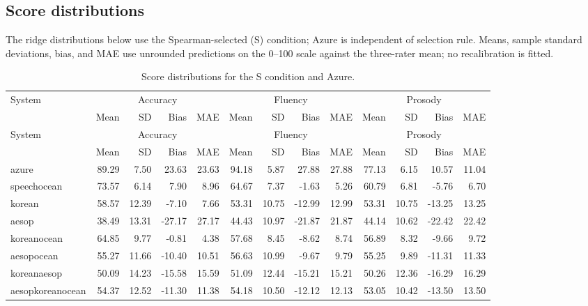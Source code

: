 \documentclass[10pt]{article}
\begin{document}
\begin{landscape}
\begingroup\small\setlength{\tabcolsep}{4pt}\setlength{\LTcapwidth}{\linewidth}
\subsection{Score distributions}
The ridge distributions below use the Spearman-selected (S) condition; Azure is independent of selection rule. Means, sample standard deviations, bias, and MAE use unrounded predictions on the 0--100 scale against the three-rater mean; no recalibration is fitted.
\begin{longtable}{@{}lrrrrrrrrrrrr@{}}
\caption{Score distributions for the S condition and Azure.}\\
\toprule
System & \multicolumn{4}{c}{Accuracy} & \multicolumn{4}{c}{Fluency} & \multicolumn{4}{c}{Prosody}\\
 & Mean & SD & Bias & MAE & Mean & SD & Bias & MAE & Mean & SD & Bias & MAE\\\midrule
\endfirsthead
\toprule
System & \multicolumn{4}{c}{Accuracy} & \multicolumn{4}{c}{Fluency} & \multicolumn{4}{c}{Prosody}\\
 & Mean & SD & Bias & MAE & Mean & SD & Bias & MAE & Mean & SD & Bias & MAE\\\midrule
\endhead
\bottomrule\endfoot
azure & 89.29 & 7.50 & 23.63 & 23.63 & 94.18 & 5.87 & 27.88 & 27.88 & 77.13 & 6.15 & 10.57 & 11.04\\
speechocean & 73.57 & 6.14 & 7.90 & 8.96 & 64.67 & 7.37 & -1.63 & 5.26 & 60.79 & 6.81 & -5.76 & 6.70\\
korean & 58.57 & 12.39 & -7.10 & 7.66 & 53.31 & 10.75 & -12.99 & 12.99 & 53.31 & 10.75 & -13.25 & 13.25\\
aesop & 38.49 & 13.31 & -27.17 & 27.17 & 44.43 & 10.97 & -21.87 & 21.87 & 44.14 & 10.62 & -22.42 & 22.42\\
koreanocean & 64.85 & 9.77 & -0.81 & 4.38 & 57.68 & 8.45 & -8.62 & 8.74 & 56.89 & 8.32 & -9.66 & 9.72\\
aesopocean & 55.27 & 11.66 & -10.40 & 10.51 & 56.63 & 10.99 & -9.67 & 9.79 & 55.25 & 9.89 & -11.31 & 11.33\\
koreanaesop & 50.09 & 14.23 & -15.58 & 15.59 & 51.09 & 12.44 & -15.21 & 15.21 & 50.26 & 12.36 & -16.29 & 16.29\\
aesopkoreanocean & 54.37 & 12.52 & -11.30 & 11.38 & 54.18 & 10.50 & -12.12 & 12.13 & 53.05 & 10.42 & -13.50 & 13.50\\
\end{longtable}

\end{landscape}
\end{document}
